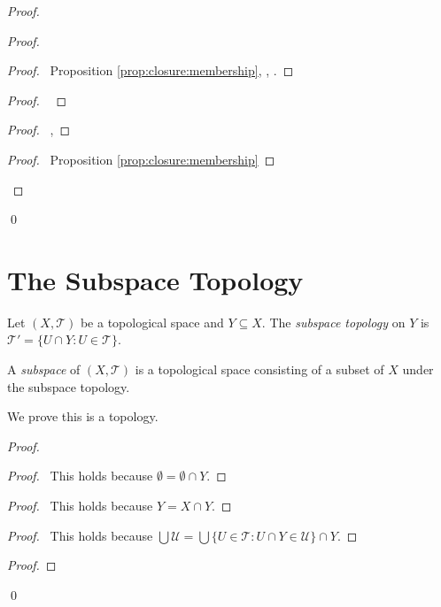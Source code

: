 \begin{proof}
\begin{proof}
\begin{proof}
      \pf\ Proposition \ref{prop:closure:membership}, , .
    \end{proof}
    \begin{proof}
      \pf\ 
    \end{proof}
    \begin{proof}
      \pf\ , 
    \end{proof}
    \qedstep
    \begin{proof}
      \pf\ Proposition \ref{prop:closure:membership}
    \end{proof}
  \end{proof}
  \qed
\end{proof}

\section{The Subspace Topology}

\begin{df}
  Let $(X, \mathcal{T})$ be a topological space and $Y \subseteq X$. The \emph{subspace topology} on $Y$ is $\mathcal{T}' = \{ U \cap Y : U \in \mathcal{T} \}$.

  A \emph{subspace} of $(X, \mathcal{T})$ is a topological space consisting of a subset of $X$ under the subspace topology.

  We prove this is a topology.
\end{df}

\begin{proof}
  \pf
  \begin{proof}
    \pf\ This holds because $\emptyset = \emptyset \cap Y$.
  \end{proof}
  \begin{proof}
    \pf\ This holds because $Y = X \cap Y$.
  \end{proof}
  \begin{proof}
    \pf\ This holds because $\bigcup \mathcal{U} = \bigcup \{ U \in \mathcal{T} : U \cap Y \in \mathcal{U} \} \cap Y$.
  \end{proof}
  \begin{proof}
  \end{proof}
  \qed
\end{proof}

